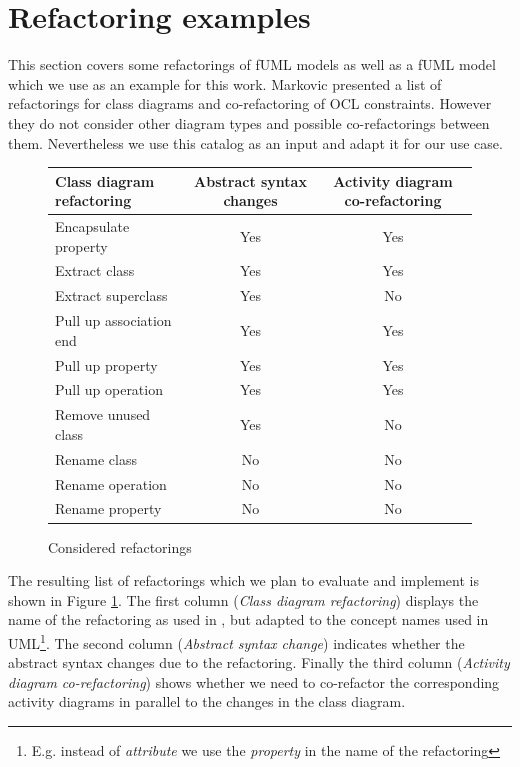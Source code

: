 \documentclass{llncs}
\begin{document}


\section{Refactoring examples}
\label{refactoring-examples}

This section covers some refactorings of fUML models as well as a fUML model which we use as an example for this work. 
Markovic \cite{DBLP:journals/sosym/MarkovicB08} presented a list of refactorings for class 
diagrams and co-refactoring of OCL constraints. However they do not consider other diagram types and possible co-refactorings between 
them. Nevertheless we use this catalog as an input and adapt it for our use case. 

\begin{figure}[h!t]
 \centering
 \begin{tabular}[]{l | c | c}
  Class diagram refactoring & Abstract syntax changes & Activity diagram co-refactoring\\
  \hline
  Encapsulate property & Yes & Yes\\
  Extract class & Yes & Yes\\
  Extract superclass & Yes & No\\
  Pull up association end & Yes & Yes\\
  Pull up property & Yes & Yes\\
  Pull up operation & Yes & Yes\\
  Remove unused class & Yes & No\\
  Rename class & No & No\\
  Rename operation & No & No\\
  Rename property & No & No\\
 \end{tabular}
 \caption{Considered refactorings}
 \label{fig:refactoringlist}
\end{figure}

The resulting list of 
refactorings which we plan to evaluate and implement is shown in Figure \ref{fig:refactoringlist}. 
The first column (\textit{Class diagram refactoring}) displays the name of the refactoring as used in \cite{DBLP:journals/sosym/MarkovicB08}, but adapted to the 
concept names used in UML\footnote{E.g. instead of \textit{attribute} we use the \textit{property} in the name of the refactoring}. 
The second column (\textit{Abstract syntax change}) indicates whether the abstract syntax changes due to the refactoring.
Finally the third column (\textit{Activity diagram co-refactoring}) shows whether we need to co-refactor the corresponding activity diagrams 
in parallel to the changes in the class diagram.
\end{document}
